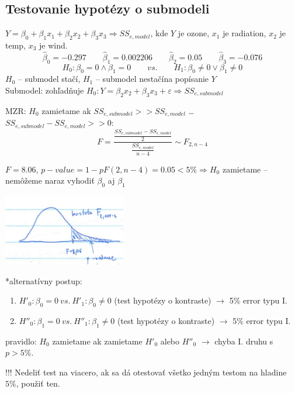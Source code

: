 \documentclass[unknownkeysallowed]{article}
\begin{document}
\subsection*{Testovanie hypotézy o submodeli}
$Y = \beta_0 + \beta_1x_1 + \beta_2x_2 + \beta_3x_3 \Rightarrow SS_{e,model}$, kde $Y$ je ozone, $x_1$ je radiation, $x_2$ je temp, $x_3$ je wind.
$$\hat{\beta}_0 = -0.297\qquad \hat{\beta}_1 = 0.002206\qquad \hat{\beta}_2 = 0.05\qquad \hat{\beta}_3 = -0.076$$
$$H_0: \beta_0 = 0 \land \beta_1 = 0 \qquad vs. \qquad H_1: \beta_0 \neq 0 \lor \beta_1 \neq 0$$
$H_0$ -- submodel stačí, $H_1$ -- submodel nestačína popísanie $Y$\\
Submodel: zohľadňuje $H_0: Y = \beta_2x_2 + \beta_3x_3 + \varepsilon \Rightarrow SS_{e,submodel}$

\begin{multicols}{2}

MZR: $H_0$ zamietame ak $SS_{e,submodel} >> SS_{e,model}$ \ldots $SS_{e,submodel} - SS_{e,model} >> 0$:
$$F= \frac{\frac{SS_{e,submodel}-SS_{e,model}}{2}}{\frac{SS_{e,model}}{n-4}} \sim F_{2,n-4}$$

$F = 8.06$, $p-value = 1-pF(2,n-4) = 0.05 < 5\% \Rightarrow H_0$ zamietame -- nemôžeme naraz vyhodiť $\beta_0$ aj $\beta_1$

\columnbreak

\includegraphics[width=0.4\textwidth]{imgs/obr32.png}

\end{multicols}

*alternatívny postup:
\begin{enumerate}
\item $H'_0: \beta_0 = 0 ~vs.~ H'_1: \beta_0 \neq 0$ (test hypotézy o kontraste) $\to$ 5\% error typu I.
\item $H''_0: \beta_1 = 0 ~vs.~ H''_1: \beta_1 \neq 0$ (test hypotézy o kontraste) $\to$ 5\% error typu I.
\end{enumerate}
pravidlo: $H_0$ zamietame ak zamietame $H'_0$ alebo $H''_0$ $\to$ chyba I. druhu s $p > 5\%$.

!!! Nedeliť test na viacero, ak sa dá otestovať všetko jedným testom na hladine $5\%$, použiť ten.
\end{document}
